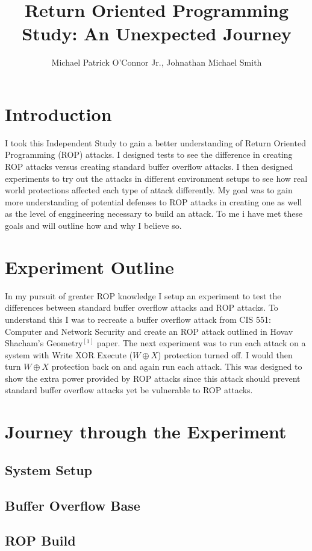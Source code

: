 \documentclass[11pt]{amsart}
\title{Return Oriented Programming Study: \newline An Unexpected Journey}
\author{Michael Patrick O'Connor Jr., Johnathan Michael Smith}
\date{}
\begin{document}
\maketitle

\newpage
\section*{Introduction}
I took this Independent Study to gain a better understanding of Return Oriented Programming (ROP) attacks. I designed tests to see the difference in creating ROP attacks versus creating standard buffer overflow attacks.  I then designed experiments to try out the attacks in different environment setups to see how real world protections affected each type of attack differently.  My goal was to gain more understanding of potential defenses to ROP attacks in creating one as well as the level of enggineering necessary to build an attack.  To me i have met these goals and will outline how and why I believe so.
\section*{Experiment Outline}
In my pursuit of greater ROP knowledge I setup an experiment to test the differences between standard buffer overflow attacks and ROP attacks.  To understand this I was to recreate a buffer overflow attack from CIS 551: Computer and Network Security and create an ROP attack outlined in Hovav Shacham's Geometry$^[1]$ paper.
The next experiment was to run each attack on a system with Write XOR Execute ($W \oplus X$) protection turned off.  I would then turn $W \oplus X$ protection back on and again run each attack.  This was designed to show the extra power provided by ROP attacks since this attack should prevent standard buffer overflow attacks yet be vulnerable to ROP attacks.
\section*{Journey through the Experiment}
\subsection*{System Setup}
\subsection*{Buffer Overflow Base}
\subsection*{ROP Build}
\end{document}
